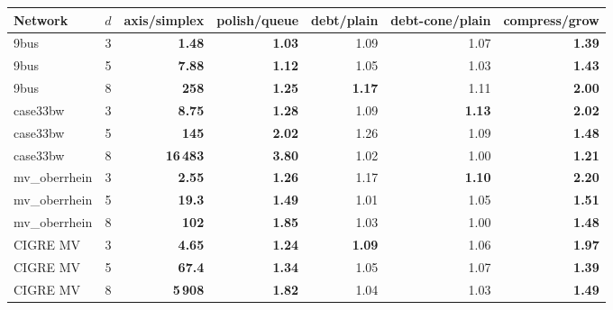 \documentclass[11pt,a4paper]{report}
\begin{document}
\begin{center}\footnotesize
\begin{tabular}{@{}lrrrrrr@{}}
\toprule
Network & $d$ & axis/simplex & polish/queue & debt/plain & debt-cone/plain & compress/grow \\
\midrule
9bus & 3 & \textbf{1.48} & \textbf{1.03} & 1.09 & 1.07 & \textbf{1.39} \\
9bus & 5 & \textbf{7.88} & \textbf{1.12} & 1.05 & 1.03 & \textbf{1.43} \\
9bus & 8 & \textbf{258} & \textbf{1.25} & \textbf{1.17} & 1.11 & \textbf{2.00} \\
case33bw & 3 & \textbf{8.75} & \textbf{1.28} & 1.09 & \textbf{1.13} & \textbf{2.02} \\
case33bw & 5 & \textbf{145} & \textbf{2.02} & 1.26 & 1.09 & \textbf{1.48} \\
case33bw & 8 & \textbf{16\,483} & \textbf{3.80} & 1.02 & 1.00 & \textbf{1.21} \\
mv\_oberrhein & 3 & \textbf{2.55} & \textbf{1.26} & 1.17 & \textbf{1.10} & \textbf{2.20} \\
mv\_oberrhein & 5 & \textbf{19.3} & \textbf{1.49} & 1.01 & 1.05 & \textbf{1.51} \\
mv\_oberrhein & 8 & \textbf{102} & \textbf{1.85} & 1.03 & 1.00 & \textbf{1.48} \\
CIGRE MV & 3 & \textbf{4.65} & \textbf{1.24} & \textbf{1.09} & 1.06 & \textbf{1.97} \\
CIGRE MV & 5 & \textbf{67.4} & \textbf{1.34} & 1.05 & 1.07 & \textbf{1.39} \\
CIGRE MV & 8 & \textbf{5\,908} & \textbf{1.82} & 1.04 & 1.03 & \textbf{1.49} \\
\bottomrule
\end{tabular}
\end{center}
\end{document}
